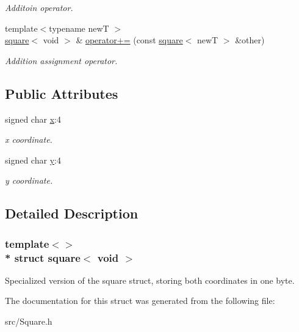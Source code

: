 \begin{DoxyCompactItemize}
\begin{DoxyCompactList}\small\item\em Additoin operator. \end{DoxyCompactList}\item 
{\footnotesize template$<$typename newT $>$ }\\\hyperlink{structsquare}{square}$<$ void $>$ \& \hyperlink{structsquare_3_01void_01_4_ad485847afc64f74cbae220e801dd3c38}{operator+=} (const \hyperlink{structsquare}{square}$<$ newT $>$ \&other)\hypertarget{structsquare_3_01void_01_4_ad485847afc64f74cbae220e801dd3c38}{}\label{structsquare_3_01void_01_4_ad485847afc64f74cbae220e801dd3c38}

\begin{DoxyCompactList}\small\item\em Addition assignment operator. \end{DoxyCompactList}\end{DoxyCompactItemize}
\subsection*{Public Attributes}
\begin{DoxyCompactItemize}
\item 
signed char \hyperlink{structsquare_3_01void_01_4_a1b2185b1eacd68916a02287c21916a25}{x}\+:4\hypertarget{structsquare_3_01void_01_4_a1b2185b1eacd68916a02287c21916a25}{}\label{structsquare_3_01void_01_4_a1b2185b1eacd68916a02287c21916a25}

\begin{DoxyCompactList}\small\item\em x coordinate. \end{DoxyCompactList}\item 
signed char \hyperlink{structsquare_3_01void_01_4_a2f5565ddd32970d151f1973db2fc3881}{y}\+:4\hypertarget{structsquare_3_01void_01_4_a2f5565ddd32970d151f1973db2fc3881}{}\label{structsquare_3_01void_01_4_a2f5565ddd32970d151f1973db2fc3881}

\begin{DoxyCompactList}\small\item\em y coordinate. \end{DoxyCompactList}\end{DoxyCompactItemize}


\subsection{Detailed Description}
\subsubsection*{template$<$$>$\\*
struct square$<$ void $>$}

Specialized version of the square struct, storing both coordinates in one byte. 

The documentation for this struct was generated from the following file\+:\begin{DoxyCompactItemize}
\item 
src/Square.\+h\end{DoxyCompactItemize}
